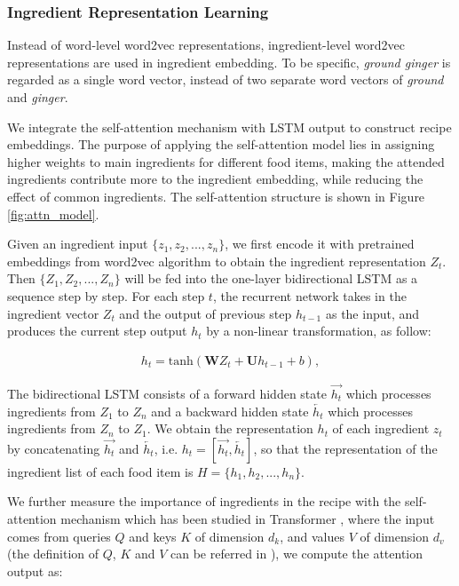 \documentclass[journal]{IEEEtran}
\begin{document}
\subsubsection{Ingredient Representation Learning}
Instead of word-level word2vec representations, ingredient-level word2vec representations are used in ingredient embedding. To be specific, \emph{ground ginger} is regarded as a single word vector, instead of two separate word vectors of \emph{ground} and \emph{ginger}. 

We integrate the self-attention mechanism with LSTM output to construct recipe embeddings. The purpose of applying the self-attention model lies in assigning higher weights to main ingredients for different food items, making the attended ingredients contribute more to the ingredient embedding, while reducing the effect of common ingredients. The self-attention structure is shown in Figure \ref{fig:attn_model}.


Given an ingredient input $\{z_1, z_2, ..., z_n\}$, we first encode it with pretrained embeddings from word2vec algorithm to obtain the ingredient representation $Z_t$. Then $\{Z_1, Z_2, ..., Z_n\}$ will be fed into the one-layer bidirectional LSTM as a sequence step by step. For each step $t$, the recurrent network takes in the ingredient vector $Z_t$ and the output of previous step $h_{t-1}$ as the input, and produces the current step output $h_t$ by a non-linear transformation, as follow:

\begin{equation}
\begin{aligned}
h_t = \mathrm{tanh}(\textbf{W}{Z_t} + \textbf{U}{h_{t-1}} + b),
\end{aligned}
\end{equation}

The bidirectional LSTM consists of a forward hidden state $\overrightarrow{h_t}$ which processes ingredients from $Z_1$ to $Z_n$ and a backward hidden state $\overleftarrow{h_t}$ which processes ingredients from $Z_n$ to $Z_1$. We obtain the representation $h_t$ of each ingredient $z_t$ by concatenating $\overrightarrow{h_t}$ and $\overleftarrow{h_t}$, i.e. $h_t=[\overrightarrow{h_t}, \overleftarrow{h_t}]$, so that the representation of the ingredient list of each food item is $H = \{h_1, h_2, ..., h_n\}$.

We further measure the importance of ingredients in the recipe with the self-attention mechanism which has been studied in Transformer \cite{vaswani2017attention}, where the input comes from queries $Q$ and keys $K$ of dimension $d_k$, and values $V$ of dimension $d_v$ (the definition of $Q$, $K$ and $V$ can be referred in \cite{vaswani2017attention}), we compute the attention output as:
\end{document}
